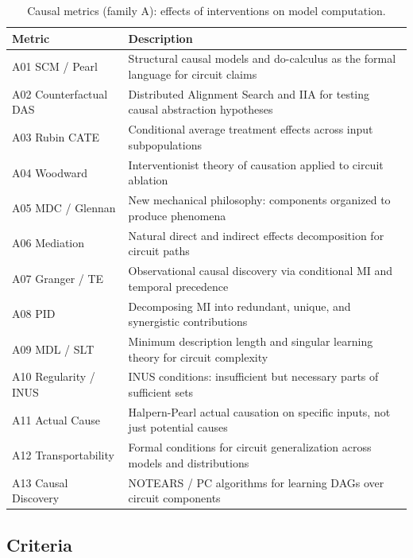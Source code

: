 \documentclass[10pt]{article}
\begin{document}
\begin{table}[H]
\centering
\small
\caption{Causal metrics (family A): effects of interventions on model computation.}
\label{tab:causal_metrics}
\renewcommand{\arraystretch}{1.15}
\begin{tabular}{@{}l>{\raggedright\arraybackslash}p{9.5cm}@{}}
\toprule
\textbf{Metric} & \textbf{Description} \\
\midrule
A01 SCM / Pearl & Structural causal models and do-calculus as the formal language for circuit claims \\
\midrule
A02 Counterfactual DAS & Distributed Alignment Search and IIA for testing causal abstraction hypotheses \\
\midrule
A03 Rubin CATE & Conditional average treatment effects across input subpopulations \\
\midrule
A04 Woodward & Interventionist theory of causation applied to circuit ablation \\
\midrule
A05 MDC / Glennan & New mechanical philosophy: components organized to produce phenomena \\
\midrule
A06 Mediation & Natural direct and indirect effects decomposition for circuit paths \\
\midrule
A07 Granger / TE & Observational causal discovery via conditional MI and temporal precedence \\
\midrule
A08 PID & Decomposing MI into redundant, unique, and synergistic contributions \\
\midrule
A09 MDL / SLT & Minimum description length and singular learning theory for circuit complexity \\
\midrule
A10 Regularity / INUS & INUS conditions: insufficient but necessary parts of sufficient sets \\
\midrule
A11 Actual Cause & Halpern-Pearl actual causation on specific inputs, not just potential causes \\
\midrule
A12 Transportability & Formal conditions for circuit generalization across models and distributions \\
\midrule
A13 Causal Discovery & NOTEARS / PC algorithms for learning DAGs over circuit components \\
\bottomrule
\end{tabular}
\end{table}

\subsection{Criteria}
\label{sec:criteria}
\end{document}
